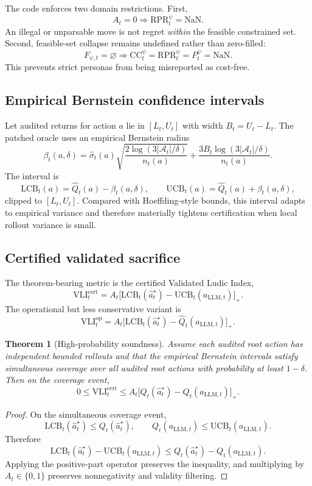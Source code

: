 \documentclass[10pt]{article}
\newtheorem{theorem}{Theorem}
\newcommand{\Aset}{\mathcal{A}}
\newcommand{\CC}{\mathrm{CC}}
\newcommand{\RPR}{\mathrm{RPR}}
\newcommand{\VLI}{\mathrm{VLI}}
\newcommand{\LCB}{\mathrm{LCB}}
\newcommand{\UCB}{\mathrm{UCB}}
\begin{document}
The code enforces two domain restrictions. First,
$$
A_t = 0 \Longrightarrow \RPR_t^\psi = \mathrm{NaN}.
$$
An illegal or unparsable move is not regret \emph{within} the feasible constrained set. Second, feasible-set collapse remains undefined rather than zero-filled:
$$
F_{\psi,t} = \varnothing \Longrightarrow \CC_t^\psi = \RPR_t^\psi = P_t^\psi = \mathrm{NaN}.
$$
This prevents strict personas from being misreported as cost-free.

\subsection{Empirical Bernstein confidence intervals}
Let audited returns for action $a$ lie in $[L_t,U_t]$ with width $B_t = U_t - L_t$. The patched oracle uses an empirical Bernstein radius
$$
\beta_t(a,\delta)
=
\hat \sigma_t(a)\sqrt{\frac{2\log(3|\Aset_t|/\delta)}{n_t(a)}}
+
\frac{3B_t\log(3|\Aset_t|/\delta)}{n_t(a)}.
$$
The interval is
$$
\LCB_t(a) = \hat Q_t(a) - \beta_t(a,\delta),
\qquad
\UCB_t(a) = \hat Q_t(a) + \beta_t(a,\delta),
$$
clipped to $[L_t,U_t]$. Compared with Hoeffding-style bounds, this interval adapts to empirical variance and therefore materially tightens certification when local rollout variance is small.

\subsection{Certified validated sacrifice}
The theorem-bearing metric is the certified Validated Ludic Index,
$$
\VLI_t^{\mathrm{cert}} = A_t\bigl[\LCB_t(\hat a_t^\star) - \UCB_t(a_{\mathrm{LLM},t})\bigr]_+.
$$
The operational but less conservative variant is
$$
\VLI_t^{\mathrm{op}} = A_t\bigl[\LCB_t(\hat a_t^\star) - \hat Q_t(a_{\mathrm{LLM},t})\bigr]_+.
$$

\begin{theorem}[High-probability soundness]
Assume each audited root action has independent bounded rollouts and that the empirical Bernstein intervals satisfy simultaneous coverage over all audited root actions with probability at least $1-\delta$. Then on the coverage event,
$$
0 \le \VLI_t^{\mathrm{cert}} \le A_t\bigl[Q_t(\hat a_t^\star) - Q_t(a_{\mathrm{LLM},t})\bigr]_+.
$$
\end{theorem}

\begin{proof}
On the simultaneous coverage event,
$$
\LCB_t(\hat a_t^\star) \le Q_t(\hat a_t^\star),
\qquad
Q_t(a_{\mathrm{LLM},t}) \le \UCB_t(a_{\mathrm{LLM},t}).
$$
Therefore
$$
\LCB_t(\hat a_t^\star) - \UCB_t(a_{\mathrm{LLM},t})
\le
Q_t(\hat a_t^\star) - Q_t(a_{\mathrm{LLM},t}).
$$
Applying the positive-part operator preserves the inequality, and multiplying by $A_t \in \{0,1\}$ preserves nonnegativity and validity filtering.
\end{proof}
\end{document}
